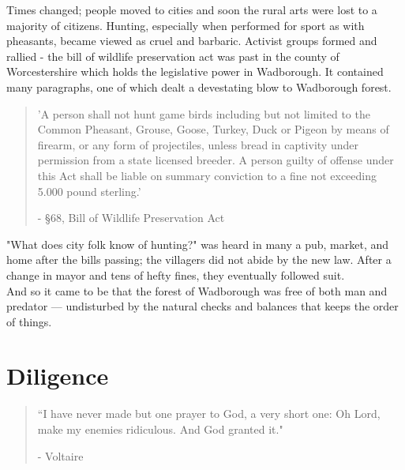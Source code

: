 \documentclass[smalldemyvopaper,11pt,twoside,onecolumn,openright,extrafontsizes]{memoir}
\begin{document}
Times changed; people moved to cities and soon the rural arts were lost to a majority of citizens. Hunting, especially when performed for sport as with pheasants, became viewed as cruel and barbaric. Activist groups formed and rallied - the bill of wildlife preservation act was past in the county of Worcestershire which holds the legislative power in Wadborough. It contained many paragraphs, one of which dealt a devestating blow to Wadborough forest.

\begin{localsize}{10}
\begin{quote}
'A person shall not hunt game birds including but not limited to the Common Pheasant, Grouse, Goose, Turkey, Duck or Pigeon by means of firearm, or any form of projectiles, unless bread in captivity under permission from a state licensed breeder. A person guilty of offense under this Act shall be liable on summary conviction to a fine not exceeding 5.000 pound sterling.'
\begin{flushright}- §68, Bill of Wildlife Preservation Act\end{flushright}
\end{quote} 
\end{localsize}

"What does city folk know of hunting?" was heard in many a pub, market, and home after the bills passing; the villagers did not abide by the new law. After a change in mayor and tens of hefty fines, they eventually followed suit.\\

And so it came to be that the forest of Wadborough was free of both man and predator — undisturbed by the natural checks and balances that keeps the order of things.

\chapter{Diligence}

\vspace{-1.3cm}
\begin{localsize}{10}
	\begin{quote}
		“I have never made but one prayer to God, a very short one: Oh Lord, make my enemies ridiculous. And God granted it."
		\begin{flushright}- Voltaire \end{flushright}
	\end{quote}
\end{localsize}
\vspace{1cm}
\end{document}

